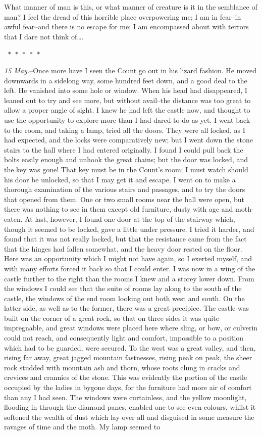 \documentclass[12pt,openright]{book}
\begin{document}
What manner of man is this, or what manner of creature is it in the semblance of man? I feel the dread of this horrible place overpowering me; I am in fear–in awful fear–and there is no escape for me; I am encompassed about with terrors that I dare not think of….

\texttt{   *       *       *       *       *}

\textit{15 May.}–Once more have I seen the Count go out in his lizard fashion. He moved downwards in a sidelong way, some hundred feet down, and a good deal to the left. He vanished into some hole or window. When his head had disappeared, I leaned out to try and see more, but without avail–the distance was too great to allow a proper angle of sight. I knew he had left the castle now, and thought to use the opportunity to explore more than I had dared to do as yet. I went back to the room, and taking a lamp, tried all the doors. They were all locked, as I had expected, and the locks were comparatively new; but I went down the stone stairs to the hall where I had entered originally. I found I could pull back the bolts easily enough and unhook the great chains; but the door was locked, and the key was gone! That key must be in the Count’s room; I must watch should his door be unlocked, so that I may get it and escape. I went on to make a thorough examination of the various stairs and passages, and to try the doors that opened from them. One or two small rooms near the hall were open, but there was nothing to see in them except old furniture, dusty with age and moth-eaten. At last, however, I found one door at the top of the stairway which, though it seemed to be locked, gave a little under pressure. I tried it harder, and found that it was not really locked, but that the resistance came from the fact that the hinges had fallen somewhat, and the heavy door rested on the floor. Here was an opportunity which I might not have again, so I exerted myself, and with many efforts forced it back so that I could enter. I was now in a wing of the castle further to the right than the rooms I knew and a storey lower down. From the windows I could see that the suite of rooms lay along to the south of the castle, the windows of the end room looking out both west and south. On the latter side, as well as to the former, there was a great precipice. The castle was built on the corner of a great rock, so that on three sides it was quite impregnable, and great windows were placed here where sling, or bow, or culverin could not reach, and consequently light and comfort, impossible to a position which had to be guarded, were secured. To the west was a great valley, and then, rising far away, great jagged mountain fastnesses, rising peak on peak, the sheer rock studded with mountain ash and thorn, whose roots clung in cracks and crevices and crannies of the stone. This was evidently the portion of the castle occupied by the ladies in bygone days, for the furniture had more air of comfort than any I had seen. The windows were curtainless, and the yellow moonlight, flooding in through the diamond panes, enabled one to see even colours, whilst it softened the wealth of dust which lay over all and disguised in some measure the ravages of time and the moth. My lamp seemed to 
\end{document}
